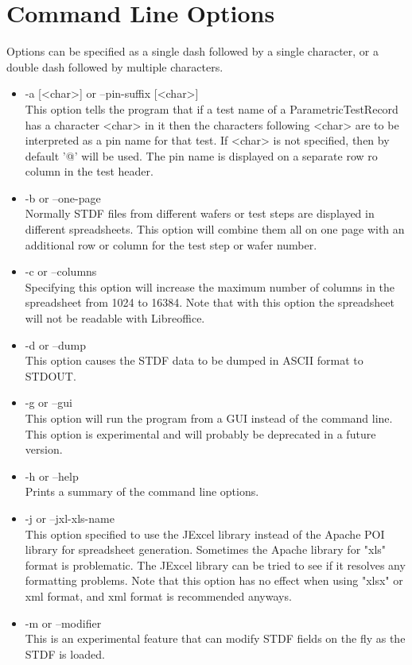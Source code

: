 \documentclass[letterpaper]{article}
\begin{document}
\section{Command Line Options}
Options can be specified as a single dash followed by a single character, or a double dash
followed by multiple characters.
\begin{itemize}
\item -a [<char>] or --pin-suffix [<char>]\\
This option tells the program that if a test name of a ParametricTestRecord has
a character <char> in it then the characters following <char> are to be interpreted
as a pin name for that test.  If <char> is not specified, then by default '@' will be used.
The pin name is displayed on a separate row ro column in the test header.
\item -b or --one-page\\
Normally STDF files from different wafers or test steps are displayed in different spreadsheets.
This option will combine them all on one page with an additional row or column for the test
step or wafer number.
\item -c or --columns\\
Specifying this option will increase the maximum number of columns in the spreadsheet
from 1024 to 16384.  Note that with this option the spreadsheet will not be
readable with Libreoffice.
\item -d or --dump\\
This option causes the STDF data to be dumped in ASCII format to STDOUT.
\item -g or --gui\\
This option will run the program from a GUI instead of the command line.  This option
is experimental and will probably be deprecated in a future version.
\item -h or --help\\
Prints a summary of the command line options.
\item -j or --jxl-xls-name\\
This option specified to use the JExcel library instead of the Apache POI library
for spreadsheet generation.  Sometimes the Apache library for "xls" format is problematic.
The JExcel library can be tried to see if it resolves any formatting problems.  Note
that this option has no effect when using "xlsx" or xml format, and xml format is
recommended anyways.
\item -m or --modifier\\
This is an experimental feature that can modify STDF fields on the fly as the STDF is loaded.

\end{itemize}
\end{document}
